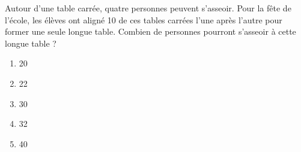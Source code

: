 Autour d'une table carrée, quatre personnes peuvent s'asseoir. Pour la
fête de l'école, les élèves ont aligné 10 de ces tables carrées l'une
après l'autre pour former une seule longue table. Combien de personnes
pourront s'asseoir à cette longue table ?
\begin{multicols}{5}
  \begin{enumerate}[A/]
  \item 20
  \item 22
  \item 30
  \item 32
  \item 40
  \end{enumerate}
\end{multicols}